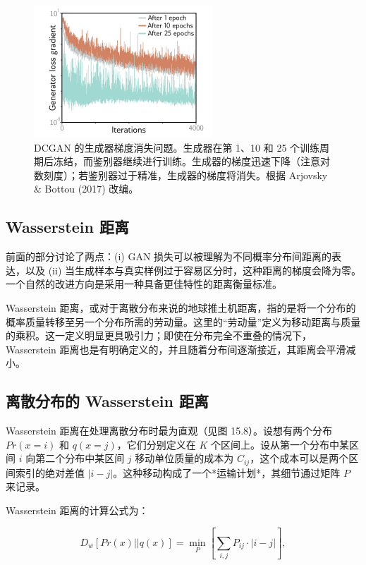 \begin{figure}[ht!]
\centering
\includegraphics[width=0.7\linewidth]{png/chapter15/GanGradients.png}
\caption{DCGAN 的生成器梯度消失问题。生成器在第 1、10 和 25 个训练周期后冻结，而鉴别器继续进行训练。生成器的梯度迅速下降（注意对数刻度）；若鉴别器过于精准，生成器的梯度将消失。根据 Arjovsky \& Bottou (2017) 改编。}
\end{figure}


\subsection{Wasserstein 距离}
前面的部分讨论了两点：(i) GAN 损失可以被理解为不同概率分布间距离的表达，以及 (ii) 当生成样本与真实样例过于容易区分时，这种距离的梯度会降为零。一个自然的改进方向是采用一种具备更佳特性的距离衡量标准。

Wasserstein 距离，或对于离散分布来说的地球推土机距离，指的是将一个分布的概率质量转移至另一个分布所需的劳动量。这里的“劳动量”定义为移动距离与质量的乘积。这一定义明显更具吸引力；即使在分布完全不重叠的情况下，Wasserstein 距离也是有明确定义的，并且随着分布间逐渐接近，其距离会平滑减小。

\subsection{离散分布的 Wasserstein 距离}
Wasserstein 距离在处理离散分布时最为直观（见图 15.8）。设想有两个分布 \(Pr(x = i)\) 和 \(q(x = j)\)，它们分别定义在 \(K\) 个区间上。设从第一个分布中某区间 \(i\) 向第二个分布中某区间 \(j\) 移动单位质量的成本为 \(C_{ij}\)，这个成本可以是两个区间索引的绝对差值 \(|i - j|\)。这种移动构成了一个*运输计划*，其细节通过矩阵 \(P\) 来记录。

Wasserstein 距离的计算公式为：

\begin{equation}
D_w [ Pr(x) || q(x) ] = \min_{P} \left[ \sum_{i,j} P_{ij} \cdot |i - j| \right], 
\end{equation}

